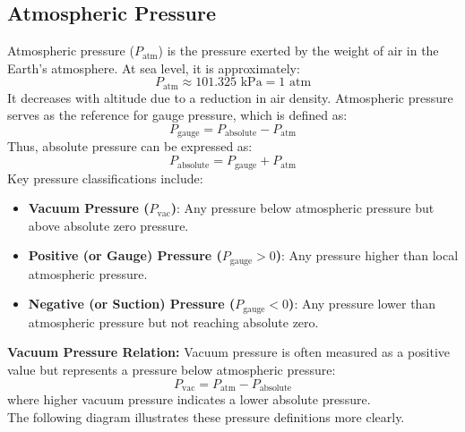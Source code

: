 \documentclass{article}
\begin{document}
\vspace{-2em}
\subsection{Atmospheric Pressure}
Atmospheric pressure ($P_{\text{atm}}$) is the pressure exerted by the weight of air in the Earth's atmosphere. At sea level, it is approximately:
\begin{equation}
	P_{\text{atm}} \approx 101.325 \text{ kPa} = 1 \text{ atm}
\end{equation}
It decreases with altitude due to a reduction in air density. Atmospheric pressure serves as the reference for gauge pressure, which is defined as:
\begin{equation}
	P_{\text{gauge}} = P_{\text{absolute}} - P_{\text{atm}}
\end{equation}
Thus, absolute pressure can be expressed as:
\begin{equation}
	P_{\text{absolute}} = P_{\text{gauge}} + P_{\text{atm}}
	\label{eq:absolute}
\end{equation}
Key pressure classifications include:\\
\vspace{-1em}
\begin{itemize}
	\item \textbf{Vacuum Pressure ($P_{\text{vac}}$)}: Any pressure below atmospheric pressure but above absolute zero pressure.
	\item \textbf{Positive (or Gauge) Pressure ($P_{\text{gauge}} > 0$)}: Any pressure higher than local atmospheric pressure.
	\item \textbf{Negative (or Suction) Pressure ($P_{\text{gauge}} < 0$)}: Any pressure lower than atmospheric pressure but not reaching absolute zero.
\end{itemize}\newpage\noindent
\textbf{Vacuum Pressure Relation:}  
Vacuum pressure is often measured as a positive value but represents a pressure below atmospheric pressure:
\begin{equation}
	P_{\text{vac}} = P_{\text{atm}} - P_{\text{absolute}}
\end{equation}
where higher vacuum pressure indicates a lower absolute pressure.\\[0.5em]
The following diagram illustrates these pressure definitions more clearly.\\\vspace{-1em}
\end{document}
